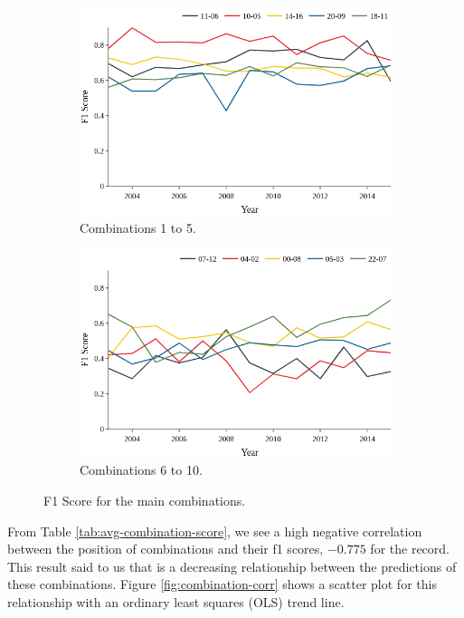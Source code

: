 \begin{figure}[h!]
	\begin{subfigure}{0.49\textwidth}
		\includegraphics[width=\linewidth]{01.Chapters/05.Results/f1-combination-1-5}
		\caption{Combinations 1 to 5.}
		\label{fig:top1-5}
	\end{subfigure}%
	\hfill
	\begin{subfigure}{0.49\textwidth}
		\includegraphics[width=\linewidth]{01.Chapters/05.Results/f1-combination-6-10}
		\caption{Combinations 6 to 10.}
		\label{fig:top6-10}
	\end{subfigure}%
	\caption{F1 Score for the main combinations.}
	\label{fig:f1-combination}
\end{figure}


From Table \ref{tab:avg-combination-score}, we see a high negative correlation between the position of combinations and their f1 scores, $-0.775$ for the record. This result said to us that is a decreasing relationship between the predictions of these combinations. Figure \ref{fig:combination-corr} shows a scatter plot for this relationship with an ordinary least squares (OLS) trend line.

